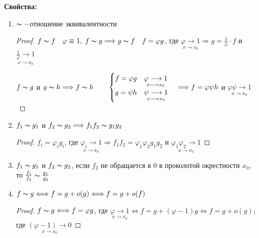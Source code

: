 \textbf{Свойства:}
\begin{enumerate}
    \item $\thicksim - $отношение эквивалентности 
    
    \begin{proof}
        $f \thicksim f \quad \varphi \equiv 1, \; f \thicksim g \Longrightarrow g \thicksim f 
        \quad f = \varphi g$, где $\underset{x \longrightarrow x_0}{\varphi \longrightarrow 1}
        \Longrightarrow g = \frac{1}{\varphi} \cdot f$ и $\underset{x \longrightarrow x_0}{\frac{1}{\varphi} \longrightarrow 1}$

        $f \thicksim g$ и $g \thicksim h \Longrightarrow f \thicksim h \qquad 
        \begin{cases}
            f = \varphi g \quad \underset{x \longrightarrow x_0}{\varphi \longrightarrow 1} \\
            g = \psi h \quad \underset{x \longrightarrow x_0}{\psi \longrightarrow 1} 
        \end{cases} \Longrightarrow f = \varphi \psi h$ и $\underset{x \longrightarrow x_0}{\varphi \psi \longrightarrow 1}$  
    \end{proof}

    \item $f_1 \thicksim g_1$ и $f_2 \thicksim g_2 \Longrightarrow f_1 f_2 \thicksim g_1 g_2$
    
    \begin{proof}
        $f_i = {\varphi}_i g_i$, где $\underset{x \longrightarrow x_0}{{\varphi}_i \longrightarrow 1} \Longrightarrow
        f_1 f_2 = {\varphi}_1 {\varphi}_2 g_1 g_2$ и $\underset{x \longrightarrow x_0}{{\varphi}_1 {\varphi}_2 \longrightarrow 1}$
    \end{proof}

    \item $f_1 \thicksim g_1$ и $f_2 \thicksim g_2$, если $f_2$ не обращается в 0 в проколотой окрестности 
    $x_0$, то $\frac{f_1}{f_2} \thicksim \frac{g_1}{g_2}$

    \item $f \thicksim g \Longleftrightarrow f = g + o(g) \Longleftrightarrow f = g + o(f)$
    
    \begin{proof}
        $f \thicksim g \Longleftrightarrow f = \varphi g$, где $\underset{x \longrightarrow x_0}{\varphi \longrightarrow 1} 
        \Longleftrightarrow f = g + (\varphi - 1)g \Longleftrightarrow f = g + o(g)$, где 
        $\underset{x \longrightarrow x_0}{(\varphi - 1) \longrightarrow 0}$


\end{proof}
\end{enumerate}

